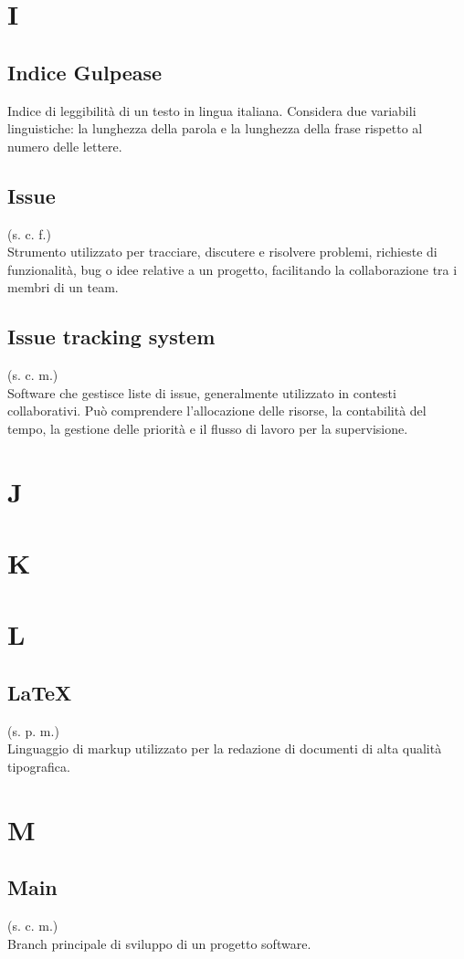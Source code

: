 \section{I}
    \subsection{Indice Gulpease}
    Indice di leggibilità di un testo in lingua italiana. Considera due variabili 
    linguistiche: la lunghezza della parola e la lunghezza della frase rispetto 
    al numero delle lettere.
    \subsection{Issue}
    \label{Issue}
    (s. c. f.)\\
    Strumento utilizzato per tracciare, discutere e risolvere problemi, richieste di funzionalità, 
    bug o idee relative a un progetto, facilitando la collaborazione tra i membri di un team.
    \subsection{Issue tracking system}
    (s. c. m.)\\
    Software che gestisce liste di issue, generalmente utilizzato in contesti collaborativi.
    Può comprendere l'allocazione delle risorse, la contabilità del tempo, la gestione delle 
    priorità e il flusso di lavoro per la supervisione.
\pagebreak
\section{J}
\pagebreak
\section{K}
\pagebreak
\section{L}
    \subsection{LaTeX}
    \label{LaTeX}
    (s. p. m.)\\
    Linguaggio di markup utilizzato per la redazione di documenti di alta qualità tipografica.
\pagebreak
\section{M}
    \subsection{Main}
    (s. c. m.)\\
    Branch principale di sviluppo di un progetto software.
